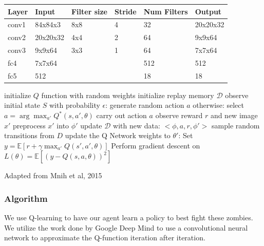 \documentclass{article}
\begin{document}
\begin{multicols}{2}
\begin{minipage}{\columnwidth}
{
\centering
\begin{tabu} to 0.9\columnwidth {X[0.6]X[1.2]XX[0.6]XX[1.2]}
    \hline
    Layer & Input    & Filter size & Stride & Num Filters & Output   \\[9pt] \hline
    conv1 & 84x84x3  & 8x8         & 4      & 32          & 20x20x32 \\ \hline
    conv2 & 20x20x32 & 4x4         & 2      & 64          & 9x9x64   \\ \hline
    conv3 & 9x9x64   & 3x3         & 1      & 64          & 7x7x64   \\ \hline
    fc4   & 7x7x64   &             &        & 512         & 512      \\ \hline
    fc5   & 512      &             &        & 18          & 18     \\ \hline
\end{tabu}
}
\end{minipage}


\begin{algorithm*}[H]
     \SetAlgoLined
     initialize $Q$ function with random weights \;
     initialize replay memory $\mathcal{D}$ \;
      {
     observe initial state $S$ \;
         {
        \DontPrintSemicolon with probability $\epsilon$: \;
        \PrintSemicolon \Indp generate random action $a$ \;
        \DontPrintSemicolon \Indm otherwise: \;
        \PrintSemicolon \Indp select $a = \arg\max_{a'} Q^*(s,a',\theta)$ \;
        \Indm
        carry out action $a$ \;
        observe reward $r$ and new image $x'$ \;
        preprocess $x'$ into $\phi'$ \;
        update $\mathcal{D}$ with new data: $<\phi,a,r,\phi'>$ \;
        sample random transitions from $D$ \;
        update the Q Network weights to $\theta'$: \;
        \Indp
        Set $y = \mathbb{E}[r + \gamma\max_{a'}Q(s',a',\theta)] $\;
        Perform gradient descent on $L(\theta) = \mathbb{E}[(y - Q(s,a,\theta))^2]$  \;
        }
     }
     \caption{Adapted from Mnih et al, 2015}
\end{algorithm*}

\subsubsection{Algorithm}
We use Q-learning to have our agent learn a policy to best fight these zombies.
We utilize the work done by Google Deep Mind to use a convolutional neural network to approximate the Q-function iteration after iteration.



\end{multicols}
\end{document}
